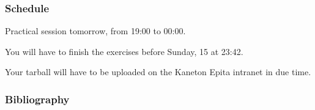 \begin{frame}
  \frametitle{Schedule}

  Practical session tomorrow, from 19:00 to 00:00.

  \-

  You will have to finish the exercises before Sunday, 15 at 23:42.

  \-

  Your tarball will have to be uploaded on the Kaneton Epita intranet in due time.
\end{frame}

%
%

\begin{frame}
  \frametitle{Bibliography}

  
  
\end{frame}


